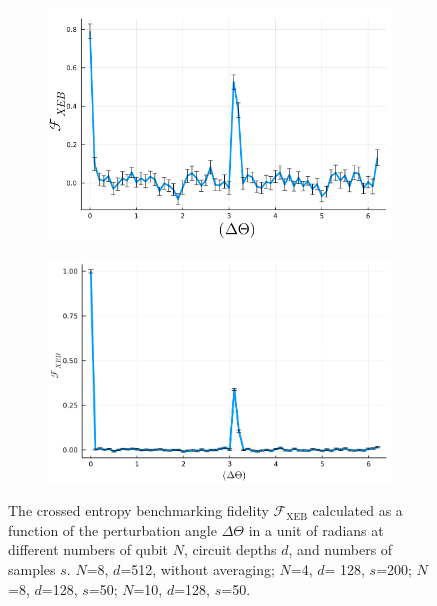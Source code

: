 \documentclass[12pt]{article}
\begin{document}
\begin{figure}
	\begin{subfigure}[t]{0.42\textwidth}
		\centering
		\includegraphics[width=\linewidth]
		{figures/Task4b_N_8_d_128_s_50_fg}
		\subcaption{\label{fig:task4b_N8}}
	\end{subfigure}%
	\begin{subfigure}[t]{0.42\textwidth}
		\centering
		\includegraphics[width=\linewidth]
		{figures/Task4b_N_10_d_128_s_50_fg}
		\subcaption{\label{fig:task4b_N10}}
	\end{subfigure}%
	\caption{
		The crossed entropy benchmarking fidelity $\mathcal{F}_\mathrm{XEB}$ calculated as a function of the perturbation angle $\Delta \Theta$ in a unit of radians at different numbers of qubit $N$, circuit depths $d$, and numbers of samples $s$.  $N$=8, $d$=512, without averaging;  $N$=4, $d$= 128, $s$=200;  $N$=8, $d$=128, $s$=50;  $N$=10, $d$=128, $s$=50.
	}
	\label{fig:XEBfidelity}
\end{figure}
\end{document}
